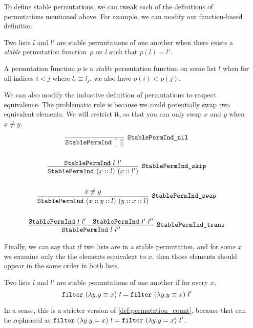 \documentclass[sigplan,10pt,anonymous,review]{thesis}
\begin{document}
To define stable permutations, we can tweak each of the definitions of
permutations mentioned above. For example, we can modify our
function-based definition.

\begin{definition}[StablePermEx]
  Two lists $l$ and $l'$ are stable permutations of one another when
  there exists a \textit{stable} permutation function~$p$ on $l$ such
  that $p(l) = l'$.
\end{definition}

\begin{definition}[StablePermFun]
  A permutation function $p$ is a \textit{stable} permutation function
  on some list $l$ when for all indices $i < j$ where $l_i \equiv l_j$, we
  also have $p(i) < p(j)$.
\end{definition}

We can also modify the inductive definition of permutations to respect
equivalence. The problematic rule is  because we could
potentially swap two equivalent elements. We will restrict it, so that
you can only swap $x$ and $y$ when $x \nequiv y$.

\begin{definition}[StablePermInd]
  \begin{gather*}
    \infer[\var{StablePermInd\_nil}]{\var{StablePermInd}~[]~[]}{}
    \\ \\
    \infer[\var{StablePermInd\_skip}]{\var{StablePermInd}~(x :: l)~(x :: l')}{%
      \var{StablePermInd}~l~l'
    }
    \\ \\
    \infer[\var{StablePermInd\_swap}]
          {\var{StablePermInd}~(x :: y :: l)~(y :: x :: l)}
          {x \not\equiv y}
    \\ \\
    \infer[\var{StablePermInd\_trans}]{\var{StablePermInd}~l~l''}{
      \var{StablePermInd}~l~l' & \var{StablePermInd}~l'~l''
    }
  \end{gather*}
\end{definition}

Finally, we can say that if two lists are in a stable permutation, and
for some $x$ we examine only the the elements equivalent to $x$, then
those elements should appear in the same order in both lists.
\begin{definition}[StablePerm]
\item Two lists $l$ and $l'$ are stable permutations of one another if
  for every $x$,
  \begin{equation*}
    \texttt{\textup{filter}}~(\lambda y. y \equiv x)~l = \texttt{\textup{filter}}~(\lambda y. y \equiv x)~l'
  \end{equation*}
\end{definition}
In a sense, this is a stricter version of
\cref{def:permutation_count}, because that can be rephrased as
$\texttt{\textup{filter}}~(\lambda y. y = x)~l = \texttt{\textup{filter}}~(\lambda y. y = x)~l'$.
\end{document}
